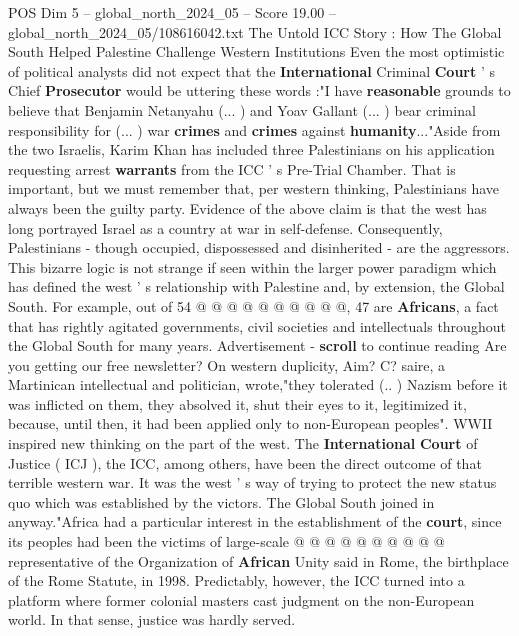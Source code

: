 \begin{textsample}{POS Dim 5 – global\_north\_2024\_05 – Score 19.00 – global\_north\_2024\_05/108616042.txt}  \label{ex:f5_pos_174}
The Untold ICC Story : How The Global South Helped Palestine Challenge Western Institutions Even the most optimistic of political analysts did not expect that the \textbf{International} Criminal \textbf{Court} ' s Chief \textbf{Prosecutor} would be uttering these words :"I have \textbf{reasonable} grounds to believe that Benjamin Netanyahu (... ) and Yoav Gallant (... ) bear criminal responsibility for (... ) war \textbf{crimes} and \textbf{crimes} against \textbf{humanity}..."Aside from the two Israelis, Karim Khan has included three Palestinians on his application requesting arrest \textbf{warrants} from the ICC ' s Pre-Trial Chamber.
That is important, but we must remember that, per western thinking, Palestinians have always been the guilty party.
Evidence of the above claim is that the west has long portrayed Israel as a country at war in self-defense.
Consequently, Palestinians - though occupied, dispossessed and disinherited - are the aggressors.
This bizarre logic is not strange if seen within the larger power paradigm which has defined the west ' s relationship with Palestine and, by extension, the Global South.
For example, out of 54 @ @ @ @ @ @ @ @ @ @, 47 are \textbf{Africans}, a fact that has rightly agitated governments, civil societies and intellectuals throughout the Global South for many years.
Advertisement - \textbf{scroll} to continue reading Are you getting our free newsletter?
On western duplicity, Aim?
C? saire, a Martinican intellectual and politician, wrote,"they tolerated (.. ) Nazism before it was inflicted on them, they absolved it, shut their eyes to it, legitimized it, because, until then, it had been applied only to non-European peoples".
WWII inspired new thinking on the part of the west.
The \textbf{International} \textbf{Court} of Justice ( ICJ ), the ICC, among others, have been the direct outcome of that terrible western war.
It was the west ' s way of trying to protect the new status quo which was established by the victors.
The Global South joined in anyway."Africa had a particular interest in the establishment of the \textbf{court}, since its peoples had been the victims of large-scale @ @ @ @ @ @ @ @ @ @ representative of the Organization of \textbf{African} Unity said in Rome, the birthplace of the Rome Statute, in 1998.
Predictably, however, the ICC turned into a platform where former colonial masters cast judgment on the non-European world.
In that sense, justice was hardly served.

\end{textsample}
